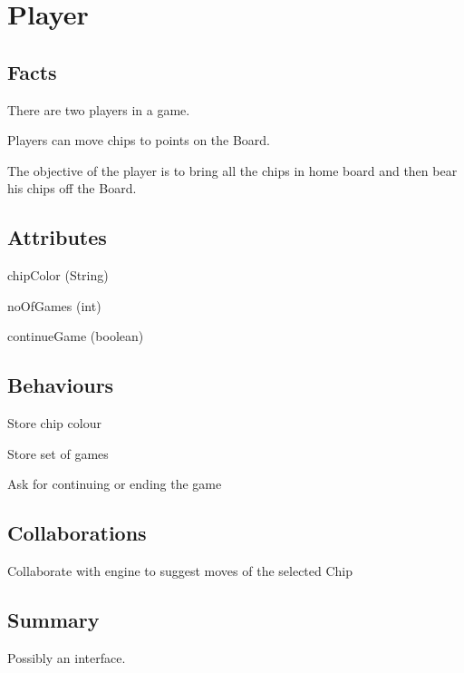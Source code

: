 \section{Player}

\subsection{Facts}

\begin{dashed}
    \item There are two players in a game.
    \item Players can move chips to points on the Board.
    \item The objective of the player is to bring all the chips in home board and then bear his chips off the Board.
\end{dashed}

\subsection{Attributes}

\begin{dashed}
    \item chipColor (String)
    \item noOfGames (int)
    \item continueGame (boolean)
\end{dashed}

\subsection{Behaviours}

\begin{dashed}
    \item Store chip colour
    \item Store set of games
    \item Ask for continuing or ending the game
\end{dashed}

\subsection{Collaborations}

\begin{dashed}
    \item Collaborate with engine to suggest moves of the selected Chip
\end{dashed}


\subsection{Summary}
Possibly an interface.
